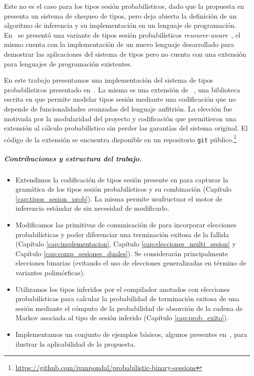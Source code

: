 Este no es el caso para los tipos sesión probabilísticos, dado que la
propuesta en~\cite{DBLP:conf/concur/InversoMPTT20} presenta un sistema de
chequeo de tipos, pero deja abierta la definición de un algoritmo de inferencia
y su implementación en un lenguaje de programación. En~\cite{DasDH20} se
presentó una variante de tipos sesión probabilísticos
\emph{resource-aware}~\cite{DasHP18}, el mismo cuenta con la implementación de
un nuevo lenguaje desarrollado para demostrar las aplicaciones del sistema de
tipos pero no cuenta con una extensión para lenguajes de programación
existentes.

En este trabajo presentamos una implementación del sistema de tipos
probabilísticos presentado en~\cite{DBLP:conf/concur/InversoMPTT20}. La misma
es una extensión de \FuSe~\cite{DBLP:journals/jfp/Padovani17}, una biblioteca
escrita en \OCaml que permite modelar tipos sesión mediante una codificación
que no depende de funcionalidades avanzadas del lenguaje anfitrión. La elección
fue motivada por la modularidad del proyecto y codificación que permitieron
una extensión al cálculo probabilístico sin perder las garantías del sistema
original. El código de la extensión se encuentra disponible en un repositorio
\texttt{git}
público.\footnote{\url{https://github.com/ivanpondal/probabilistic-binary-sessions}}

\subparagraph*{Contribuciones y estructura del trabajo.}
\begin{itemize}

	\item Extendimos la codificación de tipos sesión presente en \FuSe para
		capturar la gramática de los tipos sesión probabilísticos y su
		combinación (Capítulo \ref{cap:tipos_sesion_prob}). La misma
		permite usufructuar el motor de inferencia estándar de \OCaml
		sin necesidad de modificarlo.

	\item Modificamos las primitivas de comunicación de \FuSe para
		incorporar elecciones probabilísticas y poder diferenciar una
		terminación exitosa de la fallida (Capítulo
		\ref{cap:implementacion}, Capítulo
		\ref{cap:elecciones_multi_sesion} y Capítulo
		\ref{cap:comp_sesiones_duales}). Se considerarán principalmente
		elecciones binarias (evitando el uso de elecciones
		generalizadas en término de variantes polimórficas).

	\item Utilizamos los tipos inferidos por el compilador anotados con
		elecciones probabilísticas para calcular la probabilidad de
		terminación exitosa de una sesión mediante el cómputo de la
		probabilidad de absorción de la cadena de Markov asociada al
		tipo de sesión inferido (Capítulo \ref{cap:prob_exito}).

	\item Implementamos un conjunto de ejemplos básicos, algunos presentes
		en~\cite{DBLP:conf/concur/InversoMPTT20}, para ilustrar la
		aplicabilidad de la propuesta.
\end{itemize}
